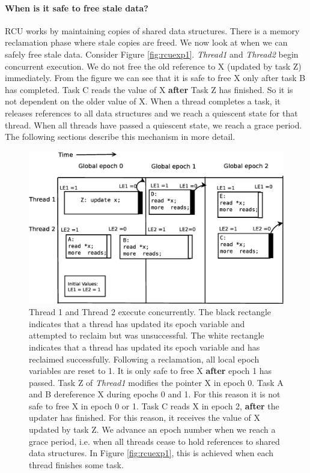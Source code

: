 \documentclass[a4paper,marginparwidth=50pt,marginparsep=10pt]{article}
\begin{document}
\paragraph{When is it safe to free stale data?}
RCU works by maintaining copies of shared data structures. There is a memory reclamation phase where stale copies are freed. We now look at when we can safely free stale data. Consider Figure \ref{fig:rcuexp1}. \emph{Thread1} and \emph{Thread2} begin concurrent execution. We do not free the old reference to X (updated by task Z) immediately. From the figure we can see that it is safe to free X only after task B has completed. Task C reads the value of X \textbf{after} Task Z has finished. So it is not dependent on the older value of X. When a thread completes a task, it releases references to all data structures and we reach a quiescent state for that thread. When all threads have passed a quiescent state, we reach a grace period. The following sections describe this mechanism in more detail.  
\begin{figure}[float=tph]
\label{fig:rcuexp2}
\begin{center}
\includegraphics[scale=0.4]{../images/diagrams/rcuexp2}
\caption{Thread 1 and Thread 2 execute concurrently. 
The black rectangle indicates that a thread has updated its epoch variable and attempted to reclaim but was unsuccessful. The white rectangle indicates that a thread has updated its epoch variable and has reclaimed successfully. Following a reclamation, all local epoch variables are reset to 1. 
It is only safe to free X  \textbf{after} epoch 1 has passed. Task Z of \emph{Thread1} modifies the pointer X in epoch 0. Task A and B dereference X during epochs 0 and 1. For this reason it is not safe to free X in epoch 0 or 1. Task C reads X in epoch 2, \textbf{after} the updater has finished. For this reason, it receives the value of X updated by task Z. We advance an epoch number when we reach a grace period, i.e. when all threads cease to hold references to shared data structures. In Figure \ref{fig:rcuexp1}, this is achieved when each thread finishes some task.}
\end{center}
\end{figure}
\end{document}
